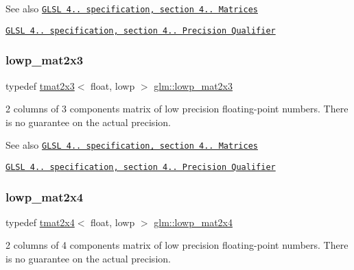 \begin{DoxySeeAlso}{See also}
\href{http://www.opengl.org/registry/doc/GLSLangSpec.4.20.8.pdf}{\tt G\+L\+SL 4.. specification, section 4.. Matrices} 

\href{http://www.opengl.org/registry/doc/GLSLangSpec.4.20.8.pdf}{\tt G\+L\+SL 4.. specification, section 4.. Precision Qualifier} 
\end{DoxySeeAlso}
\mbox{\label{group__core__precision_ga9fb4a4c96e13e4954bff1af2f99408cb}} 
\subsubsection{\texorpdfstring{lowp\+\_\+mat2x3}{lowp\_mat2x3}}
{\footnotesize\ttfamily typedef \hyperlink{structglm_1_1tmat2x3}{tmat2x3}$<$ float, lowp $>$ \hyperlink{group__core__precision_ga9fb4a4c96e13e4954bff1af2f99408cb}{glm\+::lowp\+\_\+mat2x3}}

2 columns of 3 components matrix of low precision floating-\/point numbers. There is no guarantee on the actual precision.

\begin{DoxySeeAlso}{See also}
\href{http://www.opengl.org/registry/doc/GLSLangSpec.4.20.8.pdf}{\tt G\+L\+SL 4.. specification, section 4.. Matrices} 

\href{http://www.opengl.org/registry/doc/GLSLangSpec.4.20.8.pdf}{\tt G\+L\+SL 4.. specification, section 4.. Precision Qualifier} 
\end{DoxySeeAlso}
\mbox{\label{group__core__precision_gafb9e8f974dd69b38b5acc16989882aa0}} 
\subsubsection{\texorpdfstring{lowp\+\_\+mat2x4}{lowp\_mat2x4}}
{\footnotesize\ttfamily typedef \hyperlink{structglm_1_1tmat2x4}{tmat2x4}$<$ float, lowp $>$ \hyperlink{group__core__precision_gafb9e8f974dd69b38b5acc16989882aa0}{glm\+::lowp\+\_\+mat2x4}}

2 columns of 4 components matrix of low precision floating-\/point numbers. There is no guarantee on the actual precision.

